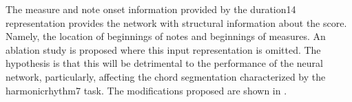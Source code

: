 
The measure and note onset information provided by the
\gls{duration14} representation provides the network with
structural information about the score. Namely, the location
of beginnings of notes and beginnings of measures. An
ablation study is proposed where this input representation
is omitted. The hypothesis is that this will be detrimental
to the performance of the neural network, particularly,
affecting the chord segmentation characterized by the
\gls{harmonicrhythm7} task. The modifications proposed are
shown in .


